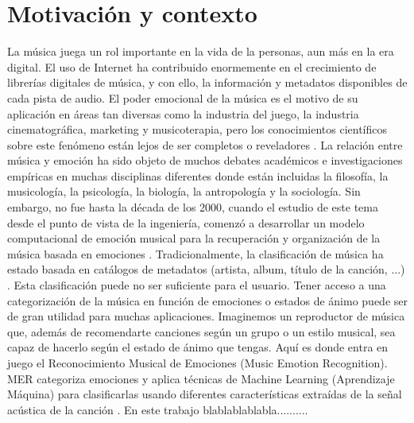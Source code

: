 \documentclass[12pt,a4paper,Spanish]{book}
\begin{document}
\section{Motivación y contexto}
La música juega un rol importante en la vida de la personas, aun más en la era digital. El uso de Internet ha contribuido enormemente en el crecimiento de librerías digitales de música, y con ello, la información y metadatos disponibles de cada pista de audio. El poder emocional de la música es el motivo de su aplicación en áreas tan diversas como la industria del juego, la industria cinematográfica, marketing y musicoterapia, pero los conocimientos científicos sobre este fenómeno están lejos de ser completos o reveladores \cite{eerola2012review}.
\newline
La relación entre música y emoción ha sido objeto de muchos debates académicos e investigaciones empíricas en muchas disciplinas diferentes donde están incluidas la filosofía, la musicología, la psicología, la biología, la antropología y la sociología. Sin embargo, no fue hasta la década de los 2000, cuando el estudio de este tema desde el punto de vista de la ingeniería, comenzó a desarrollar un modelo computacional de emoción musical para la recuperación y organización de la música basada en emociones \cite{yang2011music}.
\newline
Tradicionalmente, la clasificación de música ha estado basada en catálogos de metadatos (artista, album, título de la canción, ...) \cite{yang2011music}. Esta clasificación puede no ser suficiente para el usuario. Tener acceso a una categorización de la música en función de emociones o estados de ánimo puede ser de gran utilidad para muchas aplicaciones. Imaginemos un reproductor de música que, además de recomendarte canciones según un grupo o un estilo musical, sea capaz de hacerlo según el estado de ánimo que tengas.
\newline
Aquí es donde entra en juego el Reconocimiento Musical de Emociones (Music Emotion Recognition). MER categoriza emociones y aplica técnicas de Machine Learning (Aprendizaje Máquina) para clasificarlas usando diferentes características extraídas de la señal acústica de la canción \cite{yang2011music}.
\newline
En este trabajo blablablablabla..........
\end{document}
